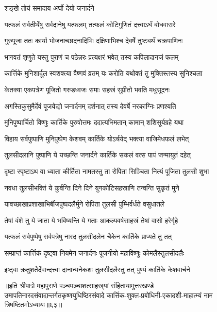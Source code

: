 \onelineshloka
{शङ्खे तोयं समादाय अर्घो देयो जनार्दने}%

\twolineshloka
{यत्फलं सर्वतीर्थेषु सर्वदानेषु यत्फलम्}
{तत्फलं कोटिगुणितं दत्त्वाऽर्घं बोधवासरे}%

\twolineshloka
{गुरुपूजा ततः कार्या भोजनाच्छादनादिभिः}
{दक्षिणाभिश्च देवर्षे तुष्ट्यर्थं चक्रपाणिनः}%

\twolineshloka
{भागवतं शृणुते यस्तु पुराणं च पठेन्नरः}
{प्रत्यक्षरं भवेत् तस्य कपिलादानजं फलम्}%

\twolineshloka
{कार्त्तिके मुनिशार्दूल स्वशक्त्या वैष्णवं व्रतम्}
{यः करोति यथोक्तं तु मुक्तिस्तस्य सुनिश्चला}%

\twolineshloka
{केतक्या एकपत्रेण पूजितो गरुडध्वजः}
{समाः सहस्रं सुप्रीतो भवति मधुसूदनः}%

\twolineshloka
{अगस्तिकुसुमैर्देवं पूजयेद्यो जनार्दनम्}
{दर्शनात् तस्य देवर्षे नरकाग्निः प्रणश्यति}%

\twolineshloka
{मुनिपुष्पार्चितो विष्णुः कार्तिके पुरुषोत्तमः}
{ददात्यभिमतान् कामान् शशिसूर्यग्रहे यथा}%

\twolineshloka
{विहाय सर्वपुष्पाणि मुनिपुष्पेण केशवम्}
{कार्तिके योऽर्चयेद् भक्त्या वाजिमेधफलं लभेत्}%

\twolineshloka
{तुलसीदलानि पुष्पाणि ये यच्छन्ति जनार्दने}
{कार्तिके सकलं वत्स पापं जन्मायुतं दहेत्}%

\twolineshloka
{दृष्टा स्पृष्टाऽथ वा ध्याता कीर्तिता नामतस्तु ता}
{रोपिता सिञ्चिता नित्यं पूजिता तुलसी शुभा}%

\twolineshloka
{नवधा तुलसीभक्तिं ये कुर्वन्ति दिने दिने}
{युगकोटिसहस्राणि तन्वन्ति सुकृतं मुने}%

\twolineshloka
{यावच्छाखाप्रशाखाभिर्बीजपुष्पदलैर्मुने}
{रोपिता तुलसी पुम्भिर्वर्धते वसुधातले}%

\twolineshloka
{तेषां वंशे तु ये जाता ये भविष्यन्ति ये गताः}
{आकल्पवर्षसाहस्रं तेषां वासो हरेर्गृहे}%

\twolineshloka
{यत्फलं सर्वपुष्पेषु सर्वपत्रेषु नारद}
{तुलसीदलेन चैकेन कार्तिके प्राप्यते तु तत्}%

\twolineshloka
{सम्प्राप्तं कार्त्तिकं दृष्ट्वा नियमेन जनार्दनः}
{पूजनीयो महाविष्णुः कोमलैस्तुलसीदलैः}%

\twolineshloka
{इष्ट्वा क्रतुशतैर्देवान्दत्त्वा दानान्यनेकशः}
{तुलसीदलैस्तु तत् पुण्यं कार्तिके केशवार्चने}%

॥इति श्रीपाद्मे महापुराणे पञ्चपञ्चाशत्साहस्र्यां संहितायामुत्तरखण्डे उमापतिनारदसंवादान्तर्गतकृष्णयुधिष्ठिरसंवादे कार्त्तिक-शुक्ल-प्रबोधिनी-एकादशी-माहात्म्यं नाम त्रिषष्टितमोऽध्यायः॥६३॥

\genMangalaShloka

\hyperref[sec:ekadashi_mahatmyam_padma_puranam]{\closesub}
\clearpage


